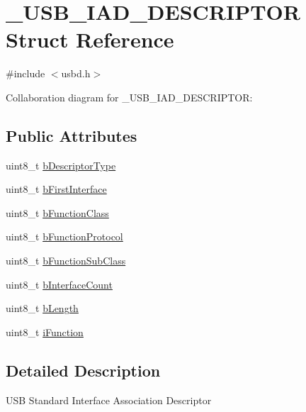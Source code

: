 \hypertarget{struct__USB__IAD__DESCRIPTOR}{}\section{\+\_\+\+U\+S\+B\+\_\+\+I\+A\+D\+\_\+\+D\+E\+S\+C\+R\+I\+P\+T\+OR Struct Reference}
\label{struct__USB__IAD__DESCRIPTOR}


{\ttfamily \#include $<$usbd.\+h$>$}



Collaboration diagram for \+\_\+\+U\+S\+B\+\_\+\+I\+A\+D\+\_\+\+D\+E\+S\+C\+R\+I\+P\+T\+OR\+:
\subsection*{Public Attributes}
\begin{DoxyCompactItemize}
\item 
uint8\+\_\+t \hyperlink{struct__USB__IAD__DESCRIPTOR_a3cb057fa923dfd71e2733fe638692687}{b\+Descriptor\+Type}
\item 
uint8\+\_\+t \hyperlink{struct__USB__IAD__DESCRIPTOR_a27e39686c573003d8d7a191139c959fd}{b\+First\+Interface}
\item 
uint8\+\_\+t \hyperlink{struct__USB__IAD__DESCRIPTOR_a4395c6765bf418652bcf73626731518b}{b\+Function\+Class}
\item 
uint8\+\_\+t \hyperlink{struct__USB__IAD__DESCRIPTOR_ab0aa68806b463f0ce4ffdcfb5c1bbba4}{b\+Function\+Protocol}
\item 
uint8\+\_\+t \hyperlink{struct__USB__IAD__DESCRIPTOR_ace36407d116b50a76320813cd2174a8c}{b\+Function\+Sub\+Class}
\item 
uint8\+\_\+t \hyperlink{struct__USB__IAD__DESCRIPTOR_adbaa947d670f827e1c063614daa792fe}{b\+Interface\+Count}
\item 
uint8\+\_\+t \hyperlink{struct__USB__IAD__DESCRIPTOR_a479007e955942af951b4f600a93f7453}{b\+Length}
\item 
uint8\+\_\+t \hyperlink{struct__USB__IAD__DESCRIPTOR_a486ad14fb6b12d498212061b9610ce02}{i\+Function}
\end{DoxyCompactItemize}


\subsection{Detailed Description}
U\+SB Standard Interface Association Descriptor 


